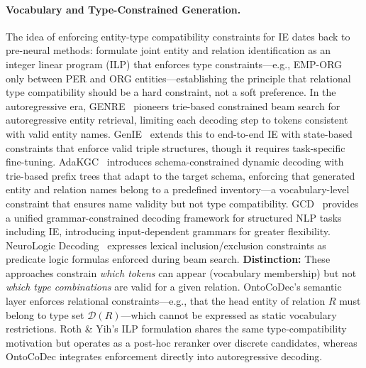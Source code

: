 \paragraph{Vocabulary and Type-Constrained Generation.}
The idea of enforcing entity-type compatibility constraints for IE dates back to pre-neural methods: \citet{roth_yih_2004} formulate joint entity and relation identification as an integer linear program (ILP) that enforces type constraints---e.g., EMP-ORG only between PER and ORG entities---establishing the principle that relational type compatibility should be a hard constraint, not a soft preference.
%
In the autoregressive era, GENRE~\cite{decao2021genre} pioneers trie-based constrained beam search for autoregressive entity retrieval, limiting each decoding step to tokens consistent with valid entity names.
%
GenIE~\cite{josifoski2022genie} extends this to end-to-end IE with state-based constraints that enforce valid triple structures, though it requires task-specific fine-tuning.
%
AdaKGC~\cite{adakgc_emnlp2023} introduces schema-constrained dynamic decoding with trie-based prefix trees that adapt to the target schema, enforcing that generated entity and relation names belong to a predefined inventory---a vocabulary-level constraint that ensures name validity but not type compatibility.
%
GCD~\cite{geng2023gcd} provides a unified grammar-constrained decoding framework for structured NLP tasks including IE, introducing input-dependent grammars for greater flexibility.
%
NeuroLogic Decoding~\cite{lu2021neurologic} expresses lexical inclusion/exclusion constraints as predicate logic formulas enforced during beam search.
%
\textbf{Distinction:} These approaches constrain \emph{which tokens} can appear (vocabulary membership) but not \emph{which type combinations} are valid for a given relation. OntoCoDec's semantic layer enforces relational constraints---e.g., that the head entity of relation $R$ must belong to type set $\mathcal{D}(R)$---which cannot be expressed as static vocabulary restrictions. Roth \& Yih's ILP formulation shares the same type-compatibility motivation but operates as a post-hoc reranker over discrete candidates, whereas OntoCoDec integrates enforcement directly into autoregressive decoding.


